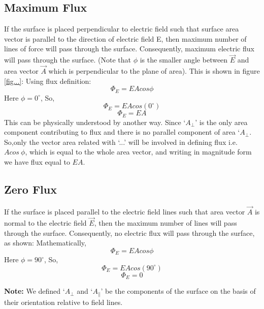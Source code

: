 \subsection*{Maximum Flux}
If the surface is placed perpendicular to electric field such
that surface area vector is parallel to the direction of electric field E,
then maximum number of lines of force will pass through the surface.
Consequently, maximum electric flux will pass through the surface.
(Note that $\phi$ is the smaller angle between $\vec{E}$ and area vector
$\vec{A}$ which is perpendicular to the plane of area).
This is shown in figure \ref{fig...}:
Using flux definition:
\begin{equation}
  \Phi_{E} = EAcos\phi \nonumber
\end{equation}
Here $\phi = 0^{\circ}$, So,
\begin{equation}
  \Phi_{E} = EAcos(0^{\circ}) \nonumber
\end{equation}
\begin{equation}
  \Phi_{E} = EA \nonumber
\end{equation}
This can be physically understood by another way.
Since `$A_{\bot}$' is the only area component contributing to flux and there
is no parallel component of area `$A_{\bot}$. So,only the vector area related with `...'
will be involved in defining flux i.e. $Acos\:\phi$, which is equal to the
whole area vector, and writing in magnitude form we have flux equal to $EA$.

\subsection*{Zero Flux}
If the surface is placed parallel to the electric field lines such that
area vector $\vec{A}$ is normal to the electric field $\vec{E}$,
then the maximum number of lines will pass through the surface. Consequently,
no electric flux will pass through the surface, as shown:
Mathematically,
\begin{equation}
  \Phi_{E} = EAcos\phi \nonumber
\end{equation}
Here $\phi = 90^{\circ}$, So,
\begin{equation}
  \Phi_{E} = EAcos(90^{\circ}) \nonumber
\end{equation}
\begin{equation}
  \Phi_{E} = 0 \nonumber
\end{equation}

\noindent\textbf{Note:} We defined `$A_{\bot}$ and `$A_{\parallel}$' be the components of the surface on the basis of
their orientation relative to field lines.

